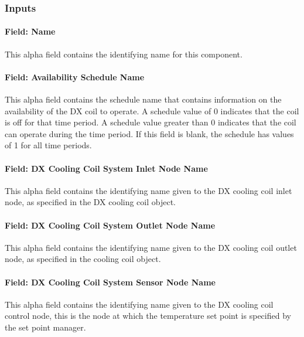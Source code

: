 \subsubsection{Inputs}\label{inputs-23-000}

\paragraph{Field: Name}\label{field-name-22-000}

This alpha field contains the identifying name for this component.

\paragraph{Field: Availability Schedule Name}\label{field-availability-schedule-name-13-000}

This alpha field contains the schedule name that contains information on the availability of the DX coil to operate. A schedule value of 0 indicates that the coil is off for that time period. A schedule value greater than 0 indicates that the coil can operate during the time period. If this field is blank, the schedule has values of 1 for all time periods.

\paragraph{Field: DX Cooling Coil System Inlet Node Name}\label{field-dx-cooling-coil-system-inlet-node-name}

This alpha field contains the identifying name given to the DX cooling coil inlet node, as specified in the DX cooling coil object.

\paragraph{Field: DX Cooling Coil System Outlet Node Name}\label{field-dx-cooling-coil-system-outlet-node-name}

This alpha field contains the identifying name given to the DX cooling coil outlet node, as specified in the cooling coil object.

\paragraph{Field: DX Cooling Coil System Sensor Node Name}\label{field-dx-cooling-coil-system-sensor-node-name}

This alpha field contains the identifying name given to the DX cooling coil control node, this is the node at which the temperature set point is specified by the set point manager.

